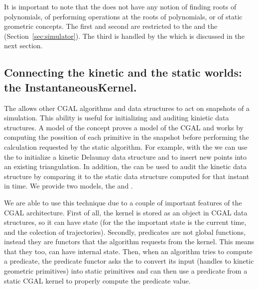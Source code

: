 It is important to note that the  does not have any notion of
finding roots of polynomials, of performing operations at the roots of
polynomials, or of static geometric concepts. The first and second are
restricted to the  and the 
(Section~\ref{sec:simulator}). The third is handled by the  which
is discussed in the next section.

\subsection{Connecting the kinetic and the static worlds: the InstantaneousKernel.}
\label{sec:instantaneous_kernel}

The  allows other CGAL algorithms and data
structures to act on snapshots of a simulation. This ability is useful
for initializing and auditing kinietic data structures. A model of the
 concept proves a model of the CGAL
 and works by computing the possition of each primitive in
the snapshot before performing the calculation requested by the static
algorithm.  For example, with the  we can use
the  to initialize a
kinetic Delaunay data structure and to insert new points into an
existing triangulation. In addition, the  can
be used to audit the kinetic data structure by comparing it to the
static data structure computed for that instant in time. We provide
two models, the
 and
.

We are able to use this technique due to a couple of important
features of the CGAL architecture. First of all, the kernel is stored
as an object in CGAL data structures, so it can have state (for the
 the important state is the current time, and
the colection of trajectories). Secondly, predicates are not global
functions, instead they are functors that the algorithm requests from
the kernel. This means that they too, can have internal state. Then,
when an algorithm tries to compute a predicate, the predicate functor
asks the  to convert its input (handles to
kinetic geometric primitives) into static primitives and can then use
a predicate from a static CGAL kernel to properly compute the
predicate value.

